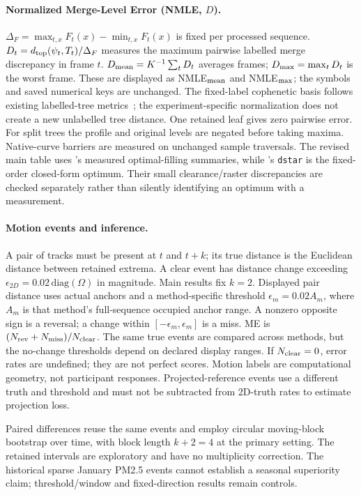 \paragraph{Normalized Merge-Level Error (NMLE, $D$).}
$\Delta_F=\max_{t,x}F_t(x)-\min_{t,x}F_t(x)$ is fixed per processed sequence. $D_t=d_{\rm top}(\psi_t,T_t)/\Delta_F$ measures the maximum pairwise labelled merge discrepancy in frame $t$. $D_{\rm mean}=K^{-1}\sum_tD_t$ averages frames; $D_{\rm max}=\max_tD_t$ is the worst frame. These are displayed as NMLE$_{\rm mean}$ and NMLE$_{\rm max}$; the symbols and saved numerical keys are unchanged. The fixed-label cophenetic basis follows existing labelled-tree metrics~\cite{Munch:2019:LINF}; the experiment-specific normalization does not create a new unlabelled tree distance. One retained leaf gives zero pairwise error. For split trees the profile and original levels are negated before taking maxima. Native-curve barriers are measured on unchanged sample traversals. The revised main table uses 's measured optimal-filling summaries, while 's \texttt{dstar} is the fixed-order closed-form optimum. Their small clearance/raster discrepancies are checked separately rather than silently identifying an optimum with a measurement.

\paragraph{Motion events and inference.}
A pair of tracks must be present at $t$ and $t+k$; its true distance is the Euclidean distance between retained extrema. A clear event has distance change exceeding $\epsilon_{2D}=0.02\,\mathrm{diag}(\Omega)$ in magnitude. Main results fix $k=2$. Displayed pair distance uses actual anchors and a method-specific threshold $\epsilon_m=0.02A_m$, where $A_m$ is that method's full-sequence occupied anchor range. A nonzero opposite sign is a reversal; a change within $[-\epsilon_m,\epsilon_m]$ is a miss. ME is $(N_{\rm rev}+N_{\rm miss})/N_{\rm clear}$. The same true events are compared across methods, but the no-change thresholds depend on declared display ranges. If $N_{\rm clear}=0$, error rates are undefined; they are not perfect scores. Motion labels are computational geometry, not participant responses. Projected-reference events use a different truth and threshold and must not be subtracted from 2D-truth rates to estimate projection loss.

Paired differences reuse the same events and employ circular moving-block bootstrap over time, with block length $k+2=4$ at the primary setting. The retained intervals are exploratory and have no multiplicity correction. The historical sparse January PM2.5 events cannot establish a seasonal superiority claim; threshold/window and fixed-direction results remain controls.

